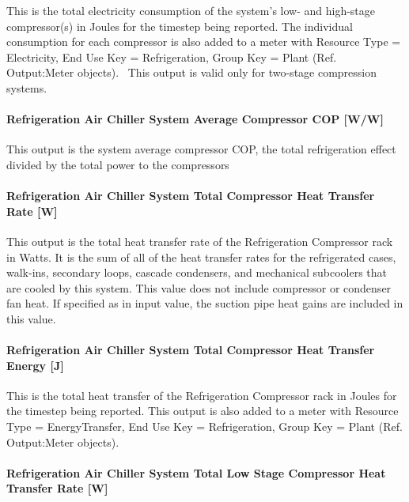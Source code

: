 This is the total electricity consumption of the system's low- and high-stage compressor(s) in Joules for the timestep being reported. The individual consumption for each compressor is also added to a meter with Resource Type = Electricity, End Use Key = Refrigeration, Group Key = Plant (Ref. Output:Meter objects).~ This output is valid only for two-stage compression systems.

\paragraph{Refrigeration Air Chiller System Average Compressor COP {[}W/W{]}}\label{refrigeration-air-chiller-system-average-compressor-cop-ww}

This output is the system average compressor COP, the total refrigeration effect divided by the total power to the compressors

\paragraph{Refrigeration Air Chiller System Total Compressor Heat Transfer Rate {[}W{]}}\label{refrigeration-air-chiller-system-total-compressor-heat-transfer-rate-w}

This output is the total heat transfer rate of the Refrigeration Compressor rack in Watts. It is the sum of all of the heat transfer rates for the refrigerated cases, walk-ins, secondary loops, cascade condensers, and mechanical subcoolers that are cooled by this system. This value does not include compressor or condenser fan heat. If specified as in input value, the suction pipe heat gains are included in this value.

\paragraph{Refrigeration Air Chiller System Total Compressor Heat Transfer Energy {[}J{]}}\label{refrigeration-air-chiller-system-total-compressor-heat-transfer-energy-j}

This is the total heat transfer of the Refrigeration Compressor rack in Joules for the timestep being reported. This output is also added to a meter with Resource Type = EnergyTransfer, End Use Key = Refrigeration, Group Key = Plant (Ref. Output:Meter objects).

\paragraph{Refrigeration Air Chiller System Total Low Stage Compressor Heat Transfer Rate {[}W{]}}\label{refrigeration-air-chiller-system-total-low-stage-compressor-heat-transfer-rate-w}

